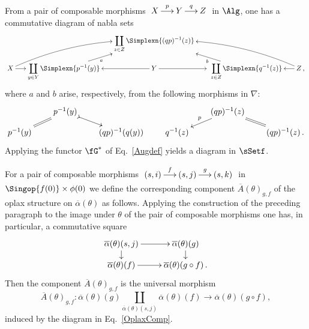 \documentclass[a4paper]{article}
\numberwithin{equation}{section}
\begin{document}
From a pair of composable morphisms $\xymatrixcolsep{1.2pc}\xymatrix{ X \ar[r]^-{p} & Y \ar[r]^-{q} & Z}$ in $\Alg$, one has a commutative diagram of nabla sets
\begin{equation*}
 \xymatrixrowsep{.8pc} \xymatrixcolsep{1.2pc} \xymatrix{ & & \displaystyle \coprod_{z \in Z} \Simplexn{(qp)^{-1}(z)} & & \\
 X \ar@/^1.1pc/[rru] \ar[r] & \displaystyle \coprod_{y \in Y} \Simplexn{p^{-1}(y)} \ar[ru]_-a  & Y \ar[r] \ar[l] &\ \displaystyle \coprod_{z \in Z} \Simplexn{ q^{-1}(z)}\ar[lu]^-b  & \ar[l] \ar@/_1.1pc/[llu] Z\, ,}
\end{equation*}
where $a$ and $b$ arise, respectively, from the following morphisms in $\nabla$:
\begin{equation*}
\xymatrixrowsep{.7pc} \xymatrixcolsep{1.7pc} \xymatrix{ & p^{-1}(y) \ar@{=}[ld] \ar@{>->}[rd] & & & (qp)^{-1}(z) \ar[ld]_-p \ar@{=}[rd] & \\
p^{-1}(y) & & (qp)^{-1}(q(y)) & q^{-1}(z) & & (qp)^{-1}(z) \, .}
\end{equation*}
Applying the functor $\fG^*$ of Eq.~\ref{Augdef} yields a diagram in $\sSetf$.

For a pair of composable morphisms $\xymatrixcolsep{1.2pc} \xymatrix{(s,i)\ar[r]^-f & (s,j) \ar[r]^-g & (s,k) }$ in $\Singop{f(0)}\times\phi(0)$ we define the corresponding component $\overline{A}(\theta)_{g,f}$ of the oplax structure on $\overline{\alpha}(\theta)$ as follows. Applying the construction of the preceding paragraph to the image under $\theta$ of the pair of composable morphisms one has, in particular, a commutative square
\begin{equation}
\label{OplaxComp}
 \xymatrixrowsep{.8pc} \xymatrix{ \overline{\alpha}(\theta)(s,j) \ar[r] \ar[d] & \overline{\alpha}(\theta)(g) \ar[d] \\
 \overline{\alpha}(\theta)(f) \ar[r] & \overline{\alpha}(\theta)(g \circ f) \, .}
\end{equation}
Then the component $\overline{A}(\theta)_{g,f}$ is the universal morphism
\begin{equation*}
 \overline{A}(\theta)_{g,f}: \overline{\alpha}(\theta)(g) \coprod_{\overline{\alpha}(\theta)(s,j)} \overline{\alpha}(\theta)(f) \to \overline{\alpha}(\theta)(g \circ f),
\end{equation*}
induced by the diagram in Eq.~\ref{OplaxComp}.
\end{document}
